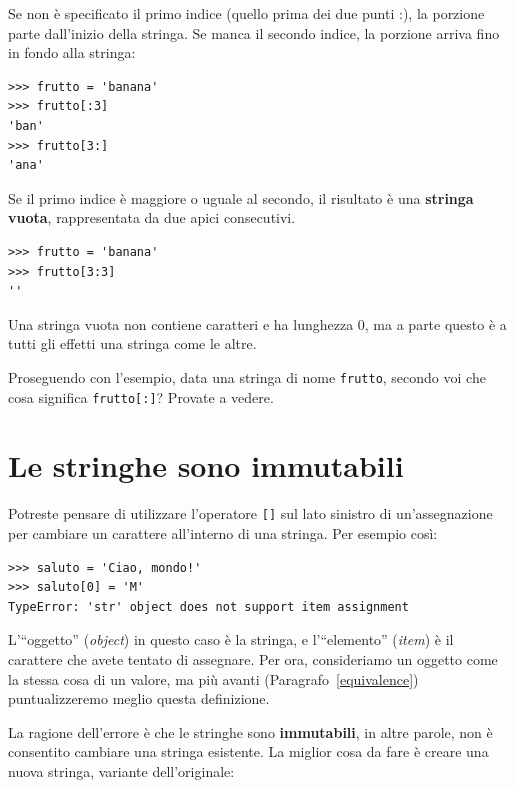 \documentclass[10pt]{book}
\begin{document}
Se non è specificato il primo indice (quello prima dei due punti :), la porzione parte dall'inizio della stringa. Se manca il secondo indice, la porzione arriva fino in fondo alla stringa:

\begin{verbatim}
>>> frutto = 'banana'
>>> frutto[:3]
'ban'
>>> frutto[3:]
'ana'
\end{verbatim}
%
Se il primo indice è maggiore o uguale al secondo, il risultato è una {\bf stringa vuota}, rappresentata da due apici consecutivi.

\begin{verbatim}
>>> frutto = 'banana'
>>> frutto[3:3]
''
\end{verbatim}
%
Una stringa vuota non contiene caratteri e ha lunghezza 0, ma a parte questo è a tutti gli effetti una stringa come le altre.

Proseguendo con l'esempio, data una stringa di nome {\tt frutto}, secondo voi che cosa significa {\tt frutto[:]}? Provate a vedere.


\section{Le stringhe sono immutabili}

Potreste pensare di utilizzare l'operatore {\tt []} sul lato sinistro di un'assegnazione per cambiare un carattere all'interno di una stringa. Per esempio così:

\begin{verbatim}
>>> saluto = 'Ciao, mondo!'
>>> saluto[0] = 'M'
TypeError: 'str' object does not support item assignment
\end{verbatim}
%
L'``oggetto'' ({\em object}) in questo caso è la stringa, e l'``elemento'' ({\em item}) è il carattere che avete tentato di assegnare. Per ora, consideriamo un  oggetto come la stessa cosa di un valore, ma più avanti (Paragrafo~\ref{equivalence}) puntualizzeremo meglio questa definizione. 

La ragione dell'errore è che le stringhe sono {\bf immutabili}, in altre parole, non è consentito cambiare una stringa esistente. La miglior cosa da fare è creare una nuova stringa, variante dell'originale:
\end{document}
